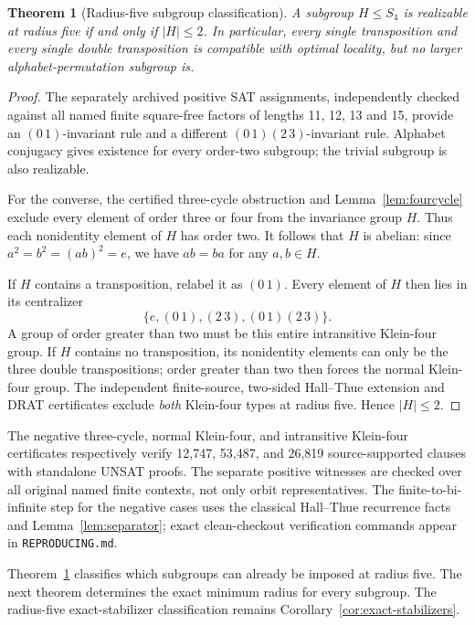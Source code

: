 \documentclass[11pt]{article}
\newtheorem{theorem}{Theorem}
\theoremstyle{remark}
\begin{document}
\begin{theorem}[Radius-five subgroup classification]
\label{thm:subgroup}
A subgroup $H\le S_4$ is realizable at radius five if
and only if $|H|\le2$. In particular, every single
transposition and every single double transposition
is compatible with optimal locality, but no larger
alphabet-permutation subgroup is.
\end{theorem}
\begin{proof}
The separately archived positive SAT assignments,
independently checked against all named finite
square-free factors of lengths 11, 12, 13 and 15,
provide an $(0\,1)$-invariant rule and a different
$(0\,1)(2\,3)$-invariant rule. Alphabet conjugacy
gives existence for every order-two subgroup; the
trivial subgroup is also realizable.

For the converse, the certified three-cycle obstruction
and Lemma~\ref{lem:fourcycle} exclude every element
of order three or four from the invariance group $H$.
Thus each nonidentity element of $H$ has order two.
It follows that $H$ is abelian: since $a^2=b^2=(ab)^2=e$,
we have $ab=ba$ for any $a,b\in H$.

If $H$ contains a transposition, relabel it as $(0\,1)$.
Every element of $H$ then lies in its centralizer
\[
 \{e,(0\,1),(2\,3),(0\,1)(2\,3)\}.
\]
A group of order greater than two must be this entire
intransitive Klein-four group. If $H$ contains no
transposition, its nonidentity elements can only be
the three double transpositions; order greater than
two then forces the normal Klein-four group.
The independent finite-source, two-sided Hall--Thue
extension and DRAT certificates exclude \emph{both}
Klein-four types at radius five. Hence $|H|\le2$.
\end{proof}

The negative three-cycle, normal Klein-four, and
intransitive Klein-four certificates respectively
verify 12,747, 53,487, and 26,819 source-supported
clauses with standalone UNSAT proofs. The separate
positive witnesses are checked over all original
named finite contexts, not only orbit representatives.
The finite-to-bi-infinite step for the negative cases
uses the classical Hall--Thue recurrence facts and
Lemma~\ref{lem:separator}; exact clean-checkout
verification commands appear in \texttt{REPRODUCING.md}.

Theorem~\ref{thm:subgroup} classifies which subgroups
can already be imposed at radius five. The next
theorem determines the exact minimum radius for
every subgroup. The radius-five exact-stabilizer
classification remains Corollary~\ref{cor:exact-stabilizers}.
\end{document}
